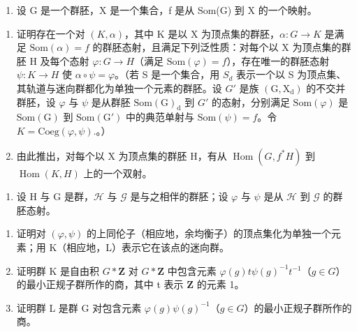 \exercisegroup

\begin{enumerate}
\def\labelenumi{\arabic{enumi})}
\tightlist
\item
  设 G 是一个群胚，X 是一个集合，f 是从 Som(G) 到 X 的一个映射。
\end{enumerate}

\begin{enumerate}
\def\labelenumi{\alph{enumi})}
\item
  证明存在一个对 \((K,\alpha)\)，其中 K 是以 X 为顶点集的群胚，\(\alpha: G \rightarrow K\) 是满足 \(\mathrm{Som}(\alpha)=f\) 的群胚态射，且满足下列泛性质：对每个以 X 为顶点集的群胚 H 及每个态射 \(\varphi:G\to H\)（满足 \(\mathrm{Som}(\varphi)=f\)），存在唯一的群胚态射 \(\psi:K\to H\) 使 \(\alpha\circ\psi=\varphi\)。（若 S 是一个集合，用 \(S_{d}\) 表示一个以 S 为顶点集、其轨道与迷向群都化为单独一个元素的群胚。设 \(G'\) 是族 \((\mathrm{G},\mathrm{X}_{\mathrm{d}})\) 的不交并群胚，设 \(\varphi\) 与 \(\psi\) 是从群胚 \(\mathrm{Som}(\mathrm{G})_{\mathrm{d}}\) 到 \(G'\) 的态射，分别满足 \(\mathrm{Som}(\varphi)\) 是 \(\mathrm{Som}(\mathrm{G})\) 到 \(\mathrm{Som}(\mathrm{G}')\) 中的典范单射与 \(\mathrm{Som}(\psi)=f\)。令 \(K=\mathrm{Coeg}(\varphi,\psi).\)。）
\item
  由此推出，对每个以 X 为顶点集的群胚 H，有从 \(\operatorname{Hom}(G, f^{*}H)\) 到 \(\operatorname{Hom}(K, H)\) 上的一个双射。
\end{enumerate}

\begin{enumerate}
\def\labelenumi{\arabic{enumi})}
\setcounter{enumi}{1}
\tightlist
\item
  设 H 与 G 是群，\(\mathcal{H}\) 与 \(\mathcal{G}\) 是与之相伴的群胚；设 \(\varphi\) 与 \(\psi\) 是从 \(\mathcal{H}\) 到 \(\mathcal{G}\) 的群胚态射。
\end{enumerate}

\begin{enumerate}
\def\labelenumi{\alph{enumi})}
\item
  证明对 \((\varphi,\psi)\) 的上同伦子（相应地，余均衡子）的顶点集化为单独一个元素；用 K（相应地，L）表示它在该点的迷向群。
\item
  证明群 K 是自由积 \(G * \mathbf{Z}\) 对 \(G * \mathbf{Z}\) 中包含元素 \(\varphi(g)t\psi(g)^{-1}t^{-1}\)（\(g \in G\)）的最小正规子群所作的商，其中 t 表示 \(\mathbf{Z}\) 的元素 1。
\item
  证明群 L 是群 G 对包含元素 \(\varphi(g)\psi(g)^{-1}\)（\(g \in G\)）的最小正规子群所作的商。
\end{enumerate}


